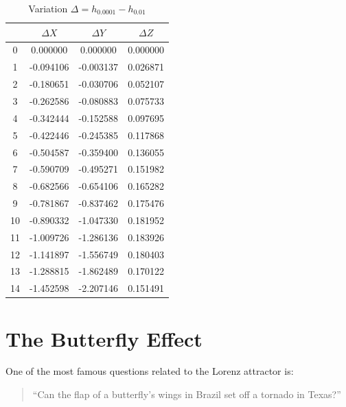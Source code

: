 \documentclass[12pt, a4paper]{article}
\begin{document}
	\begin{table}[H]
		\centering
		\footnotesize
		\begin{tabular}{|c|c|c|c|}
			\toprule
			   & $\Delta X$ & $\Delta Y$ & $\Delta Z$ \\
			\midrule
			0  & 0.000000   & 0.000000   & 0.000000   \\
			1  & -0.094106  & -0.003137  & 0.026871   \\
			2  & -0.180651  & -0.030706  & 0.052107   \\
			3  & -0.262586  & -0.080883  & 0.075733   \\
			4  & -0.342444  & -0.152588  & 0.097695   \\
			5  & -0.422446  & -0.245385  & 0.117868   \\
			6  & -0.504587  & -0.359400  & 0.136055   \\
			7  & -0.590709  & -0.495271  & 0.151982   \\
			8  & -0.682566  & -0.654106  & 0.165282   \\
			9  & -0.781867  & -0.837462  & 0.175476   \\
			10 & -0.890332  & -1.047330  & 0.181952   \\
			11 & -1.009726  & -1.286136  & 0.183926   \\
			12 & -1.141897  & -1.556749  & 0.180403   \\
			13 & -1.288815  & -1.862489  & 0.170122   \\
			14 & -1.452598  & -2.207146  & 0.151491   \\
			\bottomrule
		\end{tabular}
		\caption{Variation $\Delta = h_{0.0001} - h_{0.01}$}
	\end{table}
	    
	\newpage
	    
	    
	    
	\appendix
	\section{The Butterfly Effect}
	
	One of the most famous questions related to the Lorenz attractor is:
	
	\begin{quote}
		“Can the flap of a butterfly’s wings in Brazil set off a tornado in Texas?”
	\end{quote}
	
\end{document}
